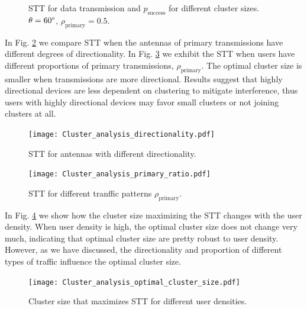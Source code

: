 \documentclass[10pt, conference, letterpaper]{IEEEtran}
\begin{document}
\begin{figure}[htp]
	\centering
	 \hfill
	
	
	\caption[]{STT for data transmission  and $p_{\mathrm{success}}$  for different cluster sizes. $\theta=60\degree$, $\rho_{\mathrm{primary}} = 0.5$. }
	\label{fig:clusteranalysis:basic}
\end{figure}

In Fig. \ref{fig:clusteranalysis:directionality} we compare STT when the antennas of primary transmissions have different degrees of directionality. In Fig. \ref{fig:clusteranalysis:primary_ratio} we exhibit the STT when users have different proportions of primary transmissions, $\rho_{\mathrm{primary}}$. 
The optimal cluster size is smaller when transmissions are more directional. 
Results suggest that highly directional devices are less dependent on clustering to mitigate interference, thus users with highly directional devices may favor small clusters or not joining clusters at all. 
\begin{figure}
	\centering
	\texttt{[image: Cluster\_analysis\_directionality.pdf]}
	\caption{STT for antennas with different directionality.}
	\label{fig:clusteranalysis:directionality}
\end{figure}

\begin{figure}
	\centering
	\texttt{[image: Cluster\_analysis\_primary\_ratio.pdf]}
	\caption{STT for different tranffic patterns $\rho_{\mathrm{primary}}$.}
	\label{fig:clusteranalysis:primary_ratio}
\end{figure}

In Fig. \ref{fig:clustereanalysis:optimal_cluster_size} we show how the cluster size maximizing the STT changes with the user density. 
When user density is high, the optimal cluster size does not change very much, indicating that optimal cluster size are pretty robust to user density. 
However, as we have discussed, the directionality and proportion of different types of traffic influence the optimal cluster size. 

\begin{figure}
	\centering
	\texttt{[image: Cluster\_analysis\_optimal\_cluster\_size.pdf]}
	\caption{Cluster size that maximizes STT for different user densities.}
	\label{fig:clustereanalysis:optimal_cluster_size}
\end{figure}
\end{document}

